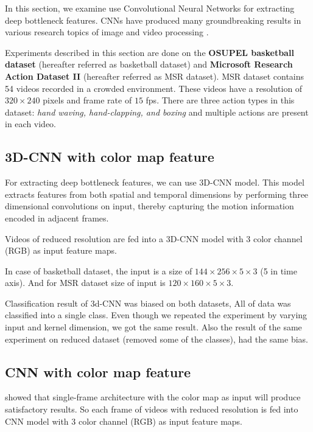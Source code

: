 In this section, we examine use Convolutional Neural Networks for extracting deep bottleneck features. CNNs have produced many groundbreaking results in various research topics of image and video processing \citep{KarpathyCVPR14, ji20133d, krizhevsky2012imagenet}. 

Experiments described in this section are done on the \textbf{OSUPEL basketball dataset} \cite{brendel2011probabilistic} (hereafter referred as basketball dataset) and \textbf{Microsoft Research Action Dataset \RN{2}} (hereafter referred as MSR dataset). MSR dataset contains 54 videos recorded in a crowded environment. These videos have a resolution of $320 \times 240$ pixels and frame rate of $15$ fps. There are three action types in this dataset: \textit{hand waving, hand-clapping, and boxing } and multiple actions are present in each video.

\subsection{3D-CNN with color map feature}
For extracting deep bottleneck features, we can use 3D-CNN model. This model extracts features from both spatial and temporal dimensions by performing three dimensional convolutions on input, thereby capturing the motion information encoded in adjacent frames\citep{ji20133d}.

Videos of reduced resolution are fed into a 3D-CNN model with 3 color channel (RGB) as input feature maps. 

In case of basketball dataset, the input is a size of $144 \times 256 \times 5 \times 3$ (5 in time axis). And for MSR dataset size of input is $120 \times 160 \times 5 \times 3$.

Classification result of 3d-CNN was biased on both datasets, All of data was classified into a single class. Even though we repeated the experiment by varying input and kernel dimension, we got the same result. Also the result of the same experiment on reduced dataset (removed some of the classes), had the same bias. 

\subsection{CNN with color map feature}
\citet{KarpathyCVPR14} showed that single-frame architecture with the color map as input will produce satisfactory results. So each frame of videos with reduced resolution is fed into CNN model with 3 color channel (RGB) as input feature maps.

